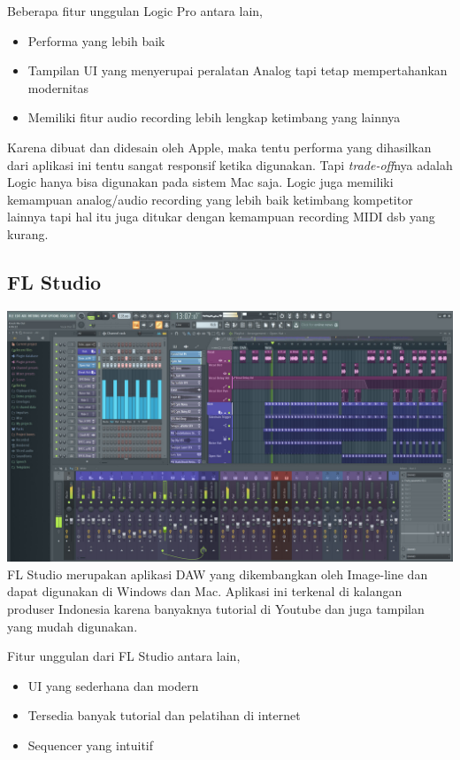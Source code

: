 Beberapa fitur unggulan Logic Pro antara lain,

\begin{itemize}
\tightlist
\item
  Performa yang lebih baik
\item
  Tampilan UI yang menyerupai peralatan Analog tapi tetap mempertahankan
  modernitas
\item
  Memiliki fitur audio recording lebih lengkap ketimbang yang lainnya
\end{itemize}

Karena dibuat dan didesain oleh Apple, maka tentu performa yang
dihasilkan dari aplikasi ini tentu sangat responsif ketika digunakan.
Tapi \emph{trade-off}nya adalah Logic hanya bisa digunakan pada sistem
Mac saja. Logic juga memiliki kemampuan analog/audio recording yang
lebih baik ketimbang kompetitor lainnya tapi hal itu juga ditukar dengan
kemampuan recording MIDI dsb yang kurang.

\hypertarget{fl-studio}{%
\subsection{FL Studio}\label{fl-studio}}

\includegraphics{images/flstudio.jpg} FL Studio merupakan aplikasi DAW
yang dikembangkan oleh Image-line dan dapat digunakan di Windows dan
Mac. Aplikasi ini terkenal di kalangan produser Indonesia karena
banyaknya tutorial di Youtube dan juga tampilan yang mudah digunakan.

Fitur unggulan dari FL Studio antara lain,

\begin{itemize}
\tightlist
\item
  UI yang sederhana dan modern
\item
  Tersedia banyak tutorial dan pelatihan di internet
\item
  Sequencer yang intuitif
\end{itemize}

